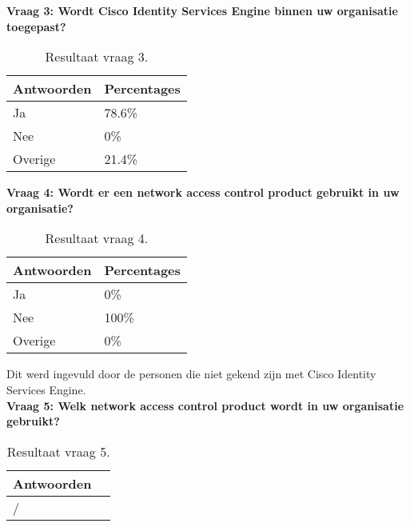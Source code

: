 \textbf{Vraag 3: Wordt Cisco Identity Services Engine binnen uw organisatie toegepast?}

\begin{table}[h!]
	\begin{center}
		\begin{tabular}{|l|l|}
			\hline
		\bf Antwoorden    & \bf Percentages \\ \hline
		Ja      & 78.6\% \\ \hline
		Nee     & 0\%    \\ \hline
		Overige & 21.4\% \\ \hline
		\end{tabular}
		\caption{Resultaat vraag 3.}
	\end{center}
\end{table}

\textbf{Vraag 4: Wordt er een network access control product gebruikt in uw organisatie? }

\begin{table}[h!]
	\begin{center}
		\begin{tabular}{|l|l|}
			\hline
			\bf Antwoorden    & \bf Percentages \\ \hline
			Ja      & 0\%   \\ \hline
			Nee     & 100\% \\ \hline
			Overige & 0\%   \\ \hline
		\end{tabular}
		\caption{Resultaat vraag 4.}
	\end{center}
\end{table}

Dit werd ingevuld door de personen die niet gekend zijn met Cisco Identity Services Engine.
\\ \textbf{Vraag 5: Welk network access control product wordt in uw organisatie gebruikt?}

\begin{table}[h!]
	\begin{center}
		\begin{tabular}{|l|l|}
			\hline
			\bf Antwoorden \\ \hline
			/ \\ \hline
		\end{tabular}
		\caption{Resultaat vraag 5.}
	\end{center}
\end{table}

